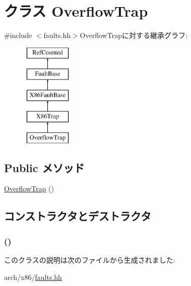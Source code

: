 \hypertarget{classX86ISA_1_1OverflowTrap}{
\section{クラス OverflowTrap}
\label{classX86ISA_1_1OverflowTrap}
}


{\ttfamily \#include $<$faults.hh$>$}OverflowTrapに対する継承グラフ:\begin{figure}[H]
\begin{center}
\leavevmode
\includegraphics[height=5cm]{classX86ISA_1_1OverflowTrap}
\end{center}
\end{figure}
\subsection*{Public メソッド}
\begin{DoxyCompactItemize}
\item 
\hyperlink{classX86ISA_1_1OverflowTrap_ac87a4353d975df89c844ef52793fb04a}{OverflowTrap} ()
\end{DoxyCompactItemize}


\subsection{コンストラクタとデストラクタ}
\hypertarget{classX86ISA_1_1OverflowTrap_ac87a4353d975df89c844ef52793fb04a}{
\subsubsection[{OverflowTrap}]{ ()}}
\label{classX86ISA_1_1OverflowTrap_ac87a4353d975df89c844ef52793fb04a}



\begin{DoxyCode}
231                        :
232             X86Trap("Overflow", "#OF", 4)
233         {}
    };
\end{DoxyCode}


このクラスの説明は次のファイルから生成されました:\begin{DoxyCompactItemize}
\item 
arch/x86/\hyperlink{arch_2x86_2faults_8hh}{faults.hh}\end{DoxyCompactItemize}
